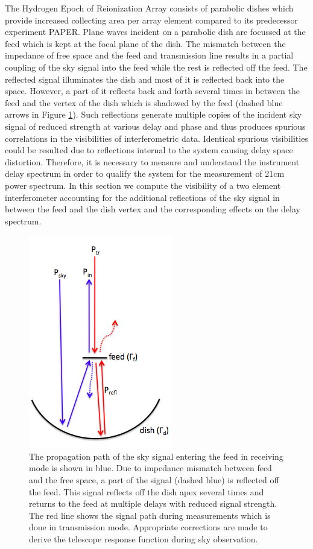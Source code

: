 \documentclass[twocolumn]{emulateapj}
\begin{document}
The Hydrogen Epoch of Reionization Array consists of parabolic dishes which provide increased collecting area per array element compared to its predecessor experiment PAPER. Plane waves incident on a parabolic dish are focussed at the feed which is kept at the focal plane of the dish.
The mismatch between the impedance of free space and the feed and transmission line results in a partial coupling of the sky signal into the feed while the rest is reflected off the feed. 
The reflected signal illuminates the dish and most of it is reflected back into the space.
However, a part of it reflects back and forth several times in between the feed and the vertex of the dish which is shadowed by the feed (dashed blue arrows in Figure \ref{fig:cartoon}).
Such reflections generate multiple copies of the incident sky signal of reduced strength at various delay and phase and thus produces spurious correlations in the visibilities of interferometric data.  Identical spurious visibilities could be resulted due to reflections internal to the system causing delay space distortion. Therefore, it is necessary to measure and understand the instrument delay spectrum in order to qualify the system for the measurement of 21cm power spectrum. 
In this section we compute the visibility of a two element interferometer accounting for the additional reflections of the sky signal in between the feed and the dish vertex and the corresponding effects on the delay spectrum. 

\begin{figure}[ht!]
\centering
\includegraphics[totalheight=0.35\textheight]{plots/reflection_cartoon.png}
\caption{The propagation path of the sky signal entering the
feed in receiving mode is shown in blue. Due to impedance mismatch between feed and the free space, a part of the signal (dashed blue) is reflected off the feed. This signal reflects off the dish apex several times and returns to the feed at multiple delays with reduced signal strength. The red line shows the signal path during measurements which is done in transmission mode. Appropriate corrections are made to derive the telescope response function during sky observation. }
\label{fig:cartoon}
\end{figure}
\end{document}
